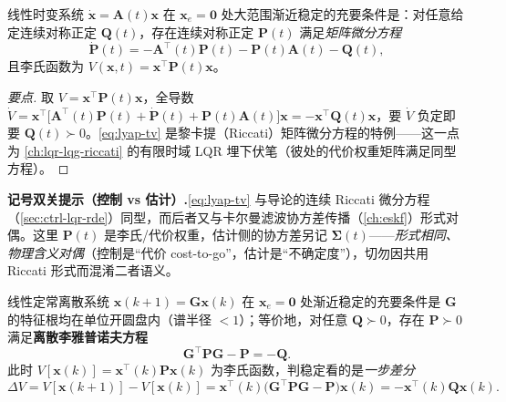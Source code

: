\begin{theorem}[线性时变连续系统渐近稳定判据]\label{thm:lyap-tv}
线性时变系统 $\dot{\mathbf{x}}=\mathbf{A}(t)\mathbf{x}$ 在 $\mathbf{x}_e=\mathbf{0}$ 处大范围渐近稳定的充要条件是：对任意给定连续对称正定 $\mathbf{Q}(t)$，存在连续对称正定 $\mathbf{P}(t)$ 满足\emph{矩阵微分方程}
\begin{equation}
  \dot{\mathbf{P}}(t)=-\mathbf{A}^\top(t)\mathbf{P}(t)-\mathbf{P}(t)\mathbf{A}(t)-\mathbf{Q}(t),
  \label{eq:lyap-tv}
\end{equation}
且李氏函数为 $V(\mathbf{x},t)=\mathbf{x}^\top\mathbf{P}(t)\mathbf{x}$。
\end{theorem}
\begin{proof}[要点]
取 $V=\mathbf{x}^\top\mathbf{P}(t)\mathbf{x}$，全导数 $\dot V=\mathbf{x}^\top\big[\mathbf{A}^\top(t)\mathbf{P}(t)+\dot{\mathbf{P}}(t)+\mathbf{P}(t)\mathbf{A}(t)\big]\mathbf{x}=-\mathbf{x}^\top\mathbf{Q}(t)\mathbf{x}$，要 $\dot V$ 负定即要 $\mathbf{Q}(t)\succ0$。\cref{eq:lyap-tv} 是黎卡提（Riccati）矩阵微分方程的特例——这一点为 \cref{ch:lqr-lqg-riccati} 的有限时域 LQR 埋下伏笔（彼处的代价权重矩阵满足同型方程）。
\end{proof}

\begin{note}
\textbf{记号双关提示（控制 vs 估计）.}\;\cref{eq:lyap-tv} 与导论的连续 Riccati 微分方程（\cref{sec:ctrl-lqr-rde}）同型，而后者又与卡尔曼滤波协方差传播（\cref{ch:eskf}）形式对偶。这里 $\mathbf{P}(t)$ 是李氏/代价权重，估计侧的协方差另记 $\boldsymbol\Sigma(t)$——\emph{形式相同、物理含义对偶}（控制是“代价 cost-to-go”，估计是“不确定度”），切勿因共用 Riccati 形式而混淆二者语义。
\end{note}

\begin{theorem}[线性定常离散系统渐近稳定判据]\label{thm:lyap-disc}
线性定常离散系统 $\mathbf{x}(k+1)=\mathbf{G}\mathbf{x}(k)$ 在 $\mathbf{x}_e=\mathbf{0}$ 处渐近稳定的充要条件是 $\mathbf{G}$ 的特征根均在单位开圆盘内（谱半径 $<1$）；等价地，对任意 $\mathbf{Q}\succ0$，存在 $\mathbf{P}\succ0$ 满足\textbf{离散李雅普诺夫方程}
\begin{equation}
  \mathbf{G}^\top\mathbf{P}\mathbf{G}-\mathbf{P}=-\mathbf{Q}.
  \label{eq:lyap-disc}
\end{equation}
此时 $V[\mathbf{x}(k)]=\mathbf{x}^\top(k)\mathbf{P}\mathbf{x}(k)$ 为李氏函数，判稳定看的是\emph{一步差分}
\begin{equation}
  \Delta V=V[\mathbf{x}(k+1)]-V[\mathbf{x}(k)]=\mathbf{x}^\top(k)\big(\mathbf{G}^\top\mathbf{P}\mathbf{G}-\mathbf{P}\big)\mathbf{x}(k)=-\mathbf{x}^\top(k)\mathbf{Q}\mathbf{x}(k).
  \label{eq:lyap-disc-delta}
\end{equation}
\end{theorem}

